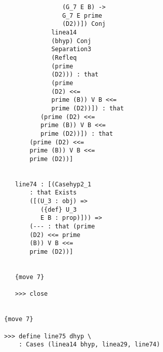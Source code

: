 \documentclass[12pt]{article}
\begin{document}
\begin{verbatim}
                                     (G_7 E B) -> 
                                     G_7 E prime 
                                     (D2))]) Conj 
                                  linea14 
                                  (bhyp) Conj 
                                  Separation3 
                                  (Refleq 
                                  (prime 
                                  (D2))) : that 
                                  (prime 
                                  (D2) <<= 
                                  prime (B)) V B <<= 
                                  prime (D2))]) : that 
                               (prime (D2) <<= 
                               prime (B)) V B <<= 
                               prime (D2))]) : that 
                            (prime (D2) <<= 
                            prime (B)) V B <<= 
                            prime (D2))]


                        line74 : [(Casehyp2_1 
                            : that Exists 
                            ([(U_3 : obj) => 
                               ({def} U_3 
                               E B : prop)])) => 
                            (--- : that (prime 
                            (D2) <<= prime 
                            (B)) V B <<= 
                            prime (D2))]


                        {move 7}

                        >>> close


                     {move 7}

                     >>> define line75 dhyp \
                         : Cases (linea14 bhyp, linea29, line74)



\end{verbatim}
\end{document}
